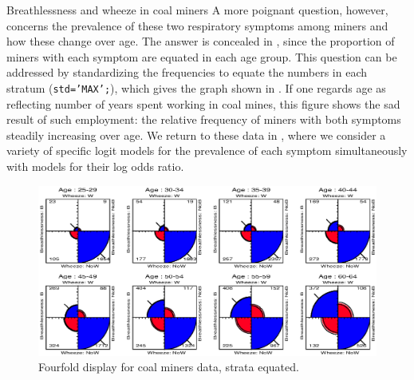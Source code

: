 \begin{Example}[wheeze1]{Breathlessness and wheeze in coal miners}
A more poignant question, however, concerns the prevalence of these
two respiratory symptoms among miners and how these change over age.
The answer is concealed in , since the
proportion of miners with each symptom are equated in each age group.
This question can be addressed by standardizing the frequencies
to equate the numbers in each stratum (\texttt{std='MAX';}),
which gives the graph shown in .
If one regards age as reflecting number of years spent working
in coal mines,
this figure shows the sad result of such employment:
the relative frequency of miners with both symptoms steadily
increasing over age.
We return to these data in ,
where we consider a variety of specific
logit models for the prevalence of each symptom
simultaneously with models for their log odds ratio.
\begin{figure}[htb]
  \centering
  \includegraphics[scale=.8,clip]{ch3/fig/pie2x2wh3}
  \caption[Fourfold display for coal miners data, strata equated]{Fourfold display for coal miners data, strata equated.}\label{fig:pie2x2wh3}
\end{figure}
\end{Example}

%

